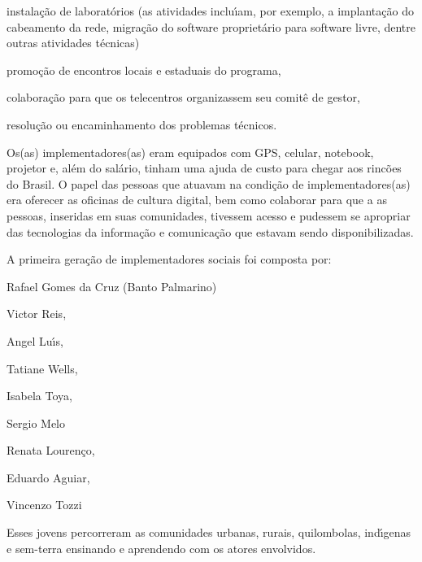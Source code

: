 \documentclass[
12pt,		%
openright,	%
twoside,  %
a4paper,			%
chapter=TITLE,		%
english,			%
french,				%
spanish,			%
brazil				%
]{USPSC-classe/USPSC}
\begin{document}
\begin{alineas}
\item instala\c{c}\~ao de laborat\'orios (as atividades inclu\'{\i}am, por exemplo, a implanta\c{c}\~ao do cabeamento da rede, migra\c{c}\~ao do software propriet\'ario para software livre, dentre outras atividades t\'ecnicas)
\item promo\c{c}\~ao de encontros locais e estaduais do programa,
\item colabora\c{c}\~ao para que os telecentros organizassem seu  comit\^e de gestor,
\item resolu\c{c}\~ao ou encaminhamento dos problemas  t\'ecnicos.
\end{alineas}

Os(as) implementadores(as) eram equipados com GPS, celular, notebook, projetor  e, al\'em do sal\'ario, tinham uma ajuda de custo para chegar aos rinc\~oes do Brasil. O papel das pessoas que atuavam na condi\c{c}\~ao de implementadores(as) era oferecer as oficinas de cultura digital, bem como colaborar para que a as pessoas, inseridas em suas comunidades, tivessem acesso e pudessem se apropriar das tecnologias da informa\c{c}\~ao e comunica\c{c}\~ao que estavam sendo disponibilizadas.









A  primeira gera\c{c}\~ao de implementadores  sociais foi composta por:










\begin{alineas}
\item Rafael Gomes da Cruz (Banto Palmarino)
\item Victor Reis,
\item Angel Lu\'{\i}s,
\item Tatiane Wells,
\item Isabela Toya,
\item Sergio Melo
\item Renata Louren\c{c}o,
\item Eduardo Aguiar,
\item Vincenzo Tozzi
\end{alineas}

Esses jovens percorreram as comunidades urbanas, rurais, quilombolas, ind\'{\i}genas e sem-terra ensinando e aprendendo com os atores envolvidos.
\end{document}
